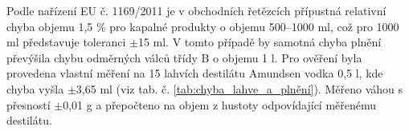 Podle nařízení EU č. 1169/2011 je v obchodních řetězcích přípustná relativní chyba objemu 1,5 \% pro kapalné produkty o objemu 500–1000 ml, což pro 1000 ml představuje toleranci $\pm$15 ml. V tomto případě by samotná chyba plnění převýšila chybu odměrných válců třídy B o objemu 1 l. Pro ověření byla provedena vlastní měření na 15 lahvích destilátu Amundsen vodka 0,5 l, kde chyba vyšla $\pm$3,65 ml (viz tab. č. \ref{tab:chyba_lahve_a_plnění}). Měřeno váhou s přesností $\pm$0,01 g a přepočteno na objem z hustoty odpovídající měřenému destilátu.









